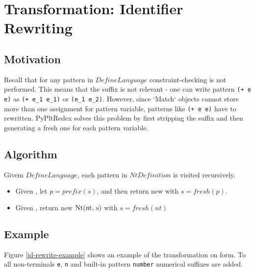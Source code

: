\section{Transformation: Identifier Rewriting}

\subsection{Motivation}

Recall that for any pattern in $DefineLanguage$ constraint-checking is not performed. This means that the suffix is not relevant - one can write pattern \texttt{(+ e e)} as \texttt{(+ e\_1 e\_1)} or \texttt{(e\_1 e\_2)}. However, since `Match` objects cannot store more than one assignment for pattern variable, patterns like \texttt{(+ e e)} have to rewritten. PyPltRedex solves this problem by first stripping the suffix and then generating a fresh one for each pattern variable.

\subsection{Algorithm}
Givem $DefineLanguage$, each pattern in $NtDefinition$ is visited recursively.

\begin{itemize}
\item Given \BuiltInPattern, let $p=prefix(s)$, and then return new \BuiltInPattern with $s= fresh(p)$.
\item Given \Nt, return new $\Nt$ with $s=fresh(nt)$
\end{itemize}

\subsection{Example}

Figure \ref{id-rewrite-example} shows an example of the transformation on \DefineLanguage form. To all non-terminals \texttt{e}, \texttt{n} and built-in pattern \texttt{number} numerical suffixes are added.

